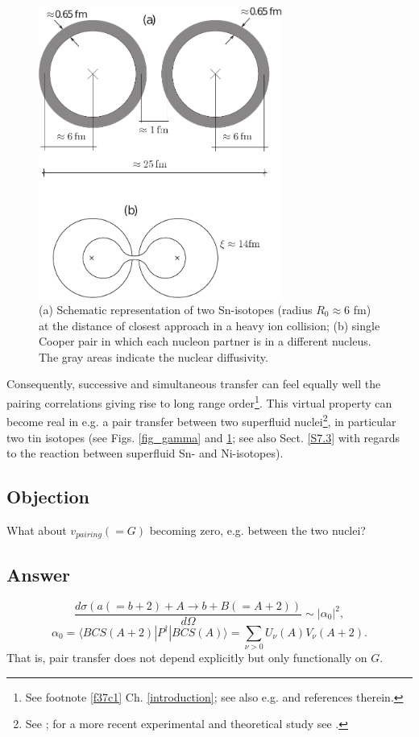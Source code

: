 \begin{figure}
\centerline{\includegraphics*[width=8cm,angle=0]{nutshell/figs/fig_1v2.pdf}}
\caption{(a) Schematic representation of two Sn-isotopes (radius $R_0\approx 6$ fm) at the distance of closest approach in a heavy ion collision; (b) single Cooper pair in which each nucleon partner is in a different nucleus. The gray areas indicate the nuclear diffusivity.}\label{fig_1}
\end{figure}


Consequently, successive and simultaneous transfer can feel equally well the pairing correlations giving rise to long range order\footnote{See footnote \ref{f37c1} Ch. \ref{introduction}; see also e.g. \cite{Potel:17} and references therein.}. This virtual property can become real in e.g. a pair transfer between two superfluid nuclei\footnote{See \cite{Oertzen:13,vonOertzen:01,Weiss:79}; for a more recent experimental and theoretical study see \cite{Montanari:14,Montanari:16}.}, in particular two tin isotopes (see Figs. \ref{fig_gamma} and \ref{fig_1}; see also Sect. \ref{S7.3} with regards to the reaction between superfluid Sn- and Ni-isotopes).
\subsection*{Objection}
What about $v_{pairing}(=G)$ becoming zero, e.g. between the two nuclei?
\subsection*{Answer}
\begin{equation}
\frac{d\sigma(a(=b+2)+A\rightarrow b+B(=A+2))}{d\Omega}\sim |\alpha_0|^2,
\end{equation}
\begin{equation}\label{eqtrans_nut1}
\alpha_0=\langle BCS(A+2) |P^\dagger|BCS(A)\rangle=\sum_{\nu>0}U_{\nu}(A)V_{\nu}(A+2).
\end{equation}
That is, pair transfer does not depend explicitly but only functionally on $G$.
